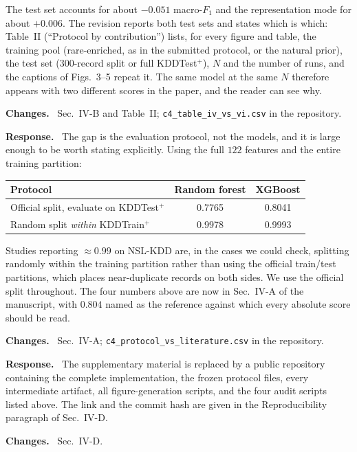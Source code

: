 \documentclass[11pt,a4paper]{article}
\newcommand{\itemhead}[2]{%
  \par\addvspace{15pt}%
  \noindent{\bfseries\color{tagink}#1}\hspace{0.7em}{\bfseries #2}%
  \par\addvspace{3.5pt}%
  \noindent{\color{rulegray}\rule{\linewidth}{0.5pt}}%
  \par\addvspace{5pt}%
  \nobreak}
\newcommand{\resp}{\par\addvspace{2pt}\noindent\textbf{Response.}\ }
\newcommand{\changed}{\par\addvspace{5pt}\noindent
  {\bfseries\color{tagink}Changes.}\ }
\begin{document}
The test set accounts for about $-0.051$ macro-$F_1$ and the representation mode
for about $+0.006$. The revision reports both test sets and states which is
which: Table~II (``Protocol by contribution'') lists, for every figure and
table, the training pool (rare-enriched, as in the submitted protocol, or the
natural prior), the test set ($300$-record split or full KDDTest$^+$), $N$ and
the number of runs, and the captions of Figs.~3--5 repeat it. The same model at
the same $N$ therefore appears with two different scores in the paper, and the
reader can see why.
\changed
Sec.~IV-B and Table~II; \texttt{c4\_table\_iv\_vs\_vi.csv} in the repository.

\itemhead{R1-9}{Classical $F_1$ low relative to values commonly reported on
NSL-KDD}
\resp
The gap is the evaluation protocol, not the models, and it is large enough to be
worth stating explicitly. Using the full $122$ features and the entire training
partition:

\begin{center}
\small
\begin{tabular}{@{}lcc@{}}
\toprule
Protocol & Random forest & XGBoost \\
\midrule
Official split, evaluate on KDDTest$^{+}$ & 0.7765 & 0.8041 \\
Random split \emph{within} KDDTrain$^{+}$ & 0.9978 & 0.9993 \\
\bottomrule
\end{tabular}
\end{center}

Studies reporting $\approx0.99$ on NSL-KDD are, in the cases we could check,
splitting randomly within the training partition rather than using the official
train/test partitions, which places near-duplicate records on both sides. We use
the official split throughout. The four numbers above are now in Sec.~IV-A of
the manuscript, with $0.804$ named as the reference against which every absolute
score should be read.
\changed
Sec.~IV-A; \texttt{c4\_protocol\_vs\_literature.csv} in the repository.

\itemhead{R1-10}{Supplementary material was not accessible}
\resp
The supplementary material is replaced by a public repository containing the
complete implementation, the frozen protocol files, every intermediate artifact,
all figure-generation scripts, and the four audit scripts listed above. The link
and the commit hash are given in the Reproducibility paragraph of Sec.~IV-D.
\changed
Sec.~IV-D.

\end{document}
